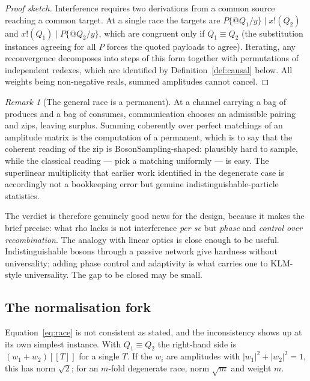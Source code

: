 \documentclass[11pt,a4paper]{article}
\theoremstyle{plain}
\theoremstyle{definition}
\theoremstyle{remark}
\newtheorem{remark}[theorem]{Remark}
\newcommand{\sem}[1]{[\![#1]\!]}
\newcommand{\scong}{\equiv}
\begin{document}
\begin{proof}[Proof sketch]
Interference requires two derivations from a common source reaching a common
target. At a single race the targets are $P\{@Q_1/y\} \mid x!(Q_2)$ and
$x!(Q_1) \mid P\{@Q_2/y\}$, which are congruent only if $Q_1 \scong Q_2$ (the
substitution instances agreeing for all $P$ forces the quoted payloads to agree).
Iterating, any reconvergence decomposes into steps of this form together with
permutations of independent redexes, which are identified by
Definition~\ref{def:causal} below. All weights being non-negative reals, summed
amplitudes cannot cancel.
\end{proof}

\begin{remark}[The general race is a permanent]\label{rem:permanent}
At a channel carrying a bag of produces and a bag of consumes, communication
chooses an admissible pairing and zips, leaving surplus. Summing coherently over
perfect matchings of an amplitude matrix is the computation of a permanent, which
is to say that the coherent reading of the zip is BosonSampling-shaped: plausibly
hard to sample, while the classical reading --- pick a matching uniformly ---
is easy. The superlinear multiplicity that earlier work identified in the
degenerate case is accordingly not a bookkeeping error but genuine
indistinguishable-particle statistics.
\end{remark}

The verdict is therefore genuinely good news for the design, because it makes the
brief precise: what rho lacks is not interference \emph{per se} but \emph{phase}
and \emph{control over recombination}. The analogy with linear optics is close
enough to be useful. Indistinguishable bosons through a passive network give
hardness without universality; adding phase control and adaptivity is what
carries one to KLM-style universality. The gap to be closed may be small.

\subsection{The normalisation fork}\label{ssec:fork}

Equation~\eqref{eq:race} is not consistent as stated, and the inconsistency shows
up at its own simplest instance. With $Q_1 \scong Q_2$ the right-hand side is
$(w_1 + w_2)\sem{T}$ for a single $T$. If the $w_i$ are amplitudes with
$|w_1|^2 + |w_2|^2 = 1$, this has norm $\sqrt{2}$; for an $m$-fold degenerate
race, norm $\sqrt{m}$ and weight $m$.
\end{document}
